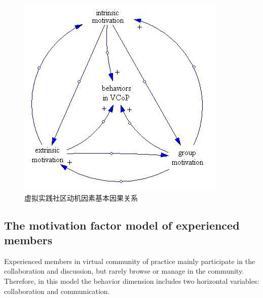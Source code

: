 \documentclass{elsarticle}
\begin{document}
\begin{figure}[htpb]
  \centering
  \label{fig:cause-and-effect}
  \includegraphics{02}
  \caption{虚拟实践社区动机因素基本因果关系}
\end{figure}

\subsection{The motivation factor model of experienced members}
\label{sec:motiv-fact-model}

 Experienced members in virtual community of practice mainly
 participate in the collaboration and discussion, but rarely browse or
 manage in the community. Therefore, in this model the behavior
 dimension includes two horizontal variables: collaboration and
 communication. 
\end{document}
